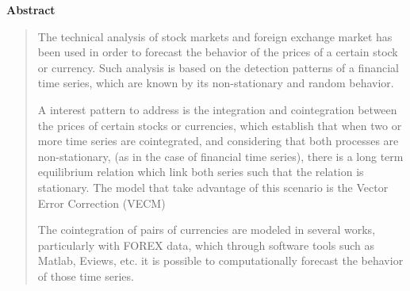 \vspace*{2cm}
\thispagestyle{empty}
{\bfseries \Huge Abstract }
\vspace{1.5cm}

\begin{quotation}
The technical analysis of stock markets and foreign exchange market has been
used in order to forecast the behavior of the prices of a certain stock
or currency. Such analysis is based on the detection patterns of
a financial time series, which are known by its non-stationary and random
behavior.


A interest pattern to address is the integration and cointegration between the
prices of certain stocks or currencies, which establish that when two or more
time series are cointegrated, and considering that both processes are
non-stationary, (as in the case of financial time series), there is a long term
equilibrium relation which link both series such that the relation is
stationary.  The model that take advantage of this scenario is the Vector Error
Correction (VECM)


The cointegration of pairs of currencies are modeled in several works, particularly
with FOREX data, which through software tools such as Matlab, Eviews, etc.
it is possible to computationally forecast the behavior of those time series.



\end{quotation}
